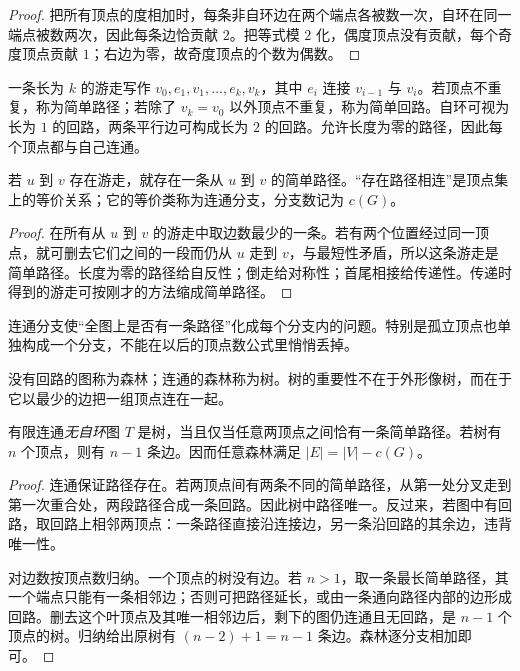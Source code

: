 \begin{proof}
把所有顶点的度相加时，每条非自环边在两个端点各被数一次，自环在同一端点被数两次，因此每条边恰贡献 $2$。把等式模 $2$ 化，偶度顶点没有贡献，每个奇度顶点贡献 $1$；右边为零，故奇度顶点的个数为偶数。
\end{proof}

一条长为 $k$ 的游走写作 $v_0,e_1,v_1,\ldots,e_k,v_k$，其中 $e_i$ 连接 $v_{i-1}$ 与 $v_i$。若顶点不重复，称为简单路径；若除了 $v_k=v_0$ 以外顶点不重复，称为简单回路。自环可视为长为 $1$ 的回路，两条平行边可构成长为 $2$ 的回路。允许长度为零的路径，因此每个顶点都与自己连通。

\begin{proposition}[游走与连通分支]
若 $u$ 到 $v$ 存在游走，就存在一条从 $u$ 到 $v$ 的简单路径。“存在路径相连”是顶点集上的等价关系；它的等价类称为连通分支，分支数记为 $c(G)$。
\end{proposition}

\begin{proof}
在所有从 $u$ 到 $v$ 的游走中取边数最少的一条。若有两个位置经过同一顶点，就可删去它们之间的一段而仍从 $u$ 走到 $v$，与最短性矛盾，所以这条游走是简单路径。长度为零的路径给自反性；倒走给对称性；首尾相接给传递性。传递时得到的游走可按刚才的方法缩成简单路径。
\end{proof}

连通分支使“全图上是否有一条路径”化成每个分支内的问题。特别是孤立顶点也单独构成一个分支，不能在以后的顶点数公式里悄悄丢掉。

没有回路的图称为森林；连通的森林称为树。树的重要性不在于外形像树，而在于它以最少的边把一组顶点连在一起。

\begin{theorem}[树的唯一路径与边数]
有限连通\emph{无自环}图 $T$ 是树，当且仅当任意两顶点之间恰有一条简单路径。若树有 $n$ 个顶点，则有 $n-1$ 条边。因而任意森林满足 $|E|=|V|-c(G)$。
\end{theorem}

\begin{proof}
连通保证路径存在。若两顶点间有两条不同的简单路径，从第一处分叉走到第一次重合处，两段路径合成一条回路。因此树中路径唯一。反过来，若图中有回路，取回路上相邻两顶点：一条路径直接沿连接边，另一条沿回路的其余边，违背唯一性。

对边数按顶点数归纳。一个顶点的树没有边。若 $n>1$，取一条最长简单路径，其一个端点只能有一条相邻边；否则可把路径延长，或由一条通向路径内部的边形成回路。删去这个叶顶点及其唯一相邻边后，剩下的图仍连通且无回路，是 $n-1$ 个顶点的树。归纳给出原树有 $(n-2)+1=n-1$ 条边。森林逐分支相加即可。
\end{proof}

